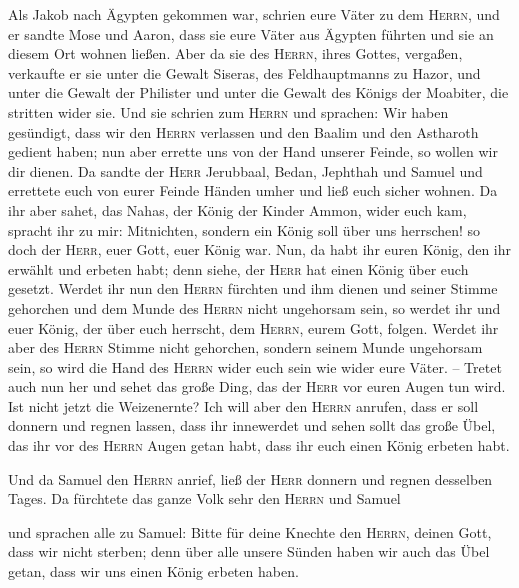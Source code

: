  Als Jakob nach Ägypten gekommen war, schrien eure Väter
zu dem \textsc{Herrn}, und er sandte Mose und Aaron, dass sie eure Väter
aus Ägypten führten und sie an diesem Ort wohnen ließen. 
Aber da sie des \textsc{Herrn}, ihres Gottes, vergaßen, verkaufte er sie
unter die Gewalt Siseras, des Feldhauptmanns zu Hazor, und unter die
Gewalt der Philister und unter die Gewalt des Königs der Moabiter, die
stritten wider sie.  Und sie schrien zum \textsc{Herrn}
und sprachen: Wir haben gesündigt, dass wir den \textsc{Herrn} verlassen
und den Baalim und den Astharoth gedient haben; nun aber errette uns von
der Hand unserer Feinde, so wollen wir dir dienen.  Da
sandte der \textsc{Herr} Jerubbaal, Bedan, Jephthah und Samuel und
errettete euch von eurer Feinde Händen umher und ließ euch sicher
wohnen.  Da ihr aber sahet, das Nahas, der König der
Kinder Ammon, wider euch kam, spracht ihr zu mir: Mitnichten, sondern
ein König soll über uns herrschen! so doch der \textsc{Herr}, euer Gott,
euer König war.  Nun, da habt ihr euren König, den ihr
erwählt und erbeten habt; denn siehe, der \textsc{Herr} hat einen König
über euch gesetzt.  Werdet ihr nun den \textsc{Herrn}
fürchten und ihm dienen und seiner Stimme gehorchen und dem Munde des
\textsc{Herrn} nicht ungehorsam sein, so werdet ihr und euer König, der
über euch herrscht, dem \textsc{Herrn}, eurem Gott, folgen.
 Werdet ihr aber des \textsc{Herrn} Stimme nicht
gehorchen, sondern seinem Munde ungehorsam sein, so wird die Hand des
\textsc{Herrn} wider euch sein wie wider eure Väter. -- 
Tretet auch nun her und sehet das große Ding, das der \textsc{Herr} vor
euren Augen tun wird.  Ist nicht jetzt die Weizenernte?
Ich will aber den \textsc{Herrn} anrufen, dass er soll donnern und
regnen lassen, dass ihr innewerdet und sehen sollt das große Übel, das
ihr vor des \textsc{Herrn} Augen getan habt, dass ihr euch einen König
erbeten habt.

 Und da Samuel den \textsc{Herrn} anrief, ließ der
\textsc{Herr} donnern und regnen desselben Tages. Da fürchtete das ganze
Volk sehr den \textsc{Herrn} und Samuel

 und sprachen alle zu Samuel: Bitte für deine Knechte den
\textsc{Herrn}, deinen Gott, dass wir nicht sterben; denn über alle
unsere Sünden haben wir auch das Übel getan, dass wir uns einen König
erbeten haben.


